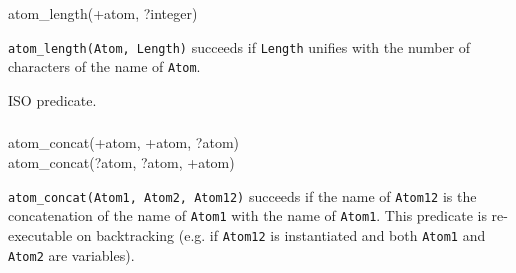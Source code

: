 \subsubsection{}

\begin{TemplatesOneCol}
atom\_length(+atom, ?integer)

\end{TemplatesOneCol}

\Description

\texttt{atom\_length(Atom, Length)} succeeds if \texttt{Length} unifies with
the number of characters of the name of \texttt{Atom}.

\begin{PlErrors}





\end{PlErrors}

\Portability

ISO predicate.

\subsubsection{}

\begin{TemplatesOneCol}
atom\_concat(+atom, +atom, ?atom)\\
atom\_concat(?atom, ?atom, +atom)

\end{TemplatesOneCol}

\Description

\texttt{atom\_concat(Atom1, Atom2, Atom12)} succeeds if the name of
\texttt{Atom12} is the concatenation of the name of \texttt{Atom1} with the
name of \texttt{Atom1}. This predicate is re-executable on backtracking
(e.g. if \texttt{Atom12} is instantiated and both \texttt{Atom1} and
\texttt{Atom2} are variables).

\begin{PlErrors}






\end{PlErrors}

